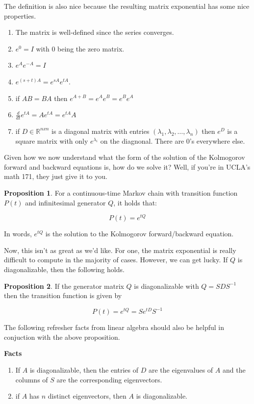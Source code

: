 \documentclass[12pt]{article}
\theoremstyle{definition}
\newtheorem{proposition}{Proposition}[section]
\begin{document}
The definition is also nice because the resulting matrix exponential has some nice properties.

\begin{enumerate}
  \item The matrix is well-defined since the series converges.
  \item $e^0 = I$ with $0$ being the zero matrix.
  \item $e^{A}e^{-A} = I$
  \item $e^{(s+t)A} = e^{sA}e^{tA}$.
  \item if $AB = BA$ then $e^{A+B} = e^{A}e^{B} = e^{B}e^{A}$
  \item $\frac{d}{dt}e^{tA} = Ae^{tA} = e^{tA}A $
  \item if $D \in  \mathbb{R}^{nxn}$ is a diagonal matrix with entries $(\lambda_1, \lambda_2, \dots, \lambda_n)$ then $e^D$ is a square matrix with only $e^{\lambda_i}$ on the diagnonal. There are 0's everywhere else.
\end{enumerate}

Given how we now understand what the form of the solution of the Kolmogorov forward and backward equations is, how do we solve it? Well, if you're in UCLA's math 171, they just give it to you.

\begin{proposition}
  For a continuous-time Markov chain with transition function $P(t)$ and infinitesimal generator $Q$, it holds that:

  $$
  P(t) = e^{tQ}
  $$

  In words, $e^{tQ}$ is the solution to the Kolmogorov forward/backward equation.
\end{proposition}

Now, this isn't as great as we'd like. For one, the matrix exponential is really difficult to compute in the majority of cases. However, we can get lucky. If $Q$ is diagonalizable, then the following holds.

\begin{proposition}
  If the generator matrix $Q$ is diagonalizable with $Q = SDS^{-1}$ then the transition function is given by

  $$
  P(t) = e^{tQ} = Se^{tD}S^{-1}
  $$
\end{proposition}

The following refresher facts from linear algebra should also be helpful in conjuction with the above proposition.

\textbf{Facts}
\begin{enumerate}
  \item If $A$ is diagonalizable, then the entries of $D$ are the eigenvalues of $A$ and the columns of $S$ are the corresponding eigenvectors.
  \item if $A$ has $n$ distinct eigenvectors, then $A$ is diagonalizable.
\end{enumerate}
\end{document}
